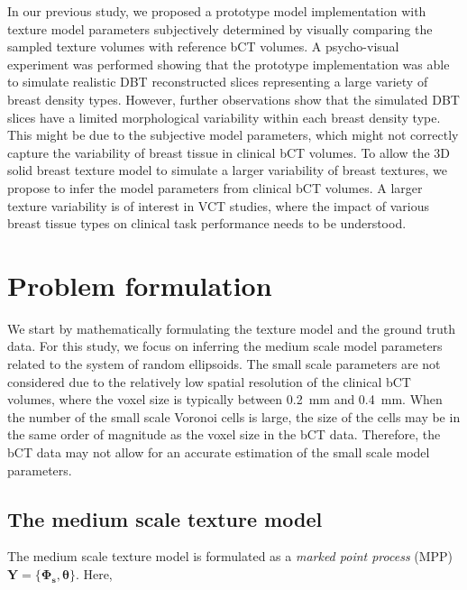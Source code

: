 \documentclass[journal]{IEEEtran}
\begin{document}
In our previous study, we proposed a prototype model implementation
with texture model parameters subjectively determined by visually
comparing the sampled texture volumes with reference bCT volumes. A
psycho-visual experiment was performed showing that the prototype
implementation was able to simulate realistic DBT reconstructed slices
representing a large variety of breast density types. However, further
observations show that the simulated DBT slices have a limited
morphological variability within each breast density type. This might
be due to the subjective model parameters, which might not correctly
capture the variability of breast tissue in clinical bCT volumes. To
allow the 3D solid breast texture model to simulate a larger
variability of breast textures, we propose to infer the model
parameters from clinical bCT volumes. A larger texture variability is
of interest in VCT studies, where the impact of various breast tissue
types on clinical task performance needs to be understood.

\section{Problem formulation}
\label{sec:problem-formulation}

We start by mathematically formulating the texture model and the
ground truth data. For this study, we focus on inferring the
medium scale model parameters related to the system of random
ellipsoids. The small scale parameters are not considered due to the
relatively low spatial resolution of the clinical bCT volumes, where
the voxel size is typically between \SI{0.2}{\mm} and
\SI{0.4}{\mm}. When the number of the small scale Voronoi cells is
large, the size of the cells may be in the same order of magnitude as
the voxel size in the bCT data. Therefore, the bCT data may not allow
for an accurate estimation of the small scale model parameters.

\subsection{The medium scale texture model}
\label{sec:medium-scale-texture}

The medium scale texture model is formulated as a \textit{marked point
  process} (MPP) \cite{chiu2013stochastic} $\mathbf{Y} = \{
\mathbf{\Phi_{s}},\boldsymbol{\theta} \}$. Here,
\end{document}

